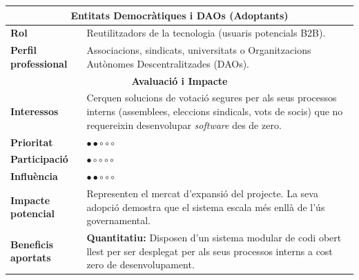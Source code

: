 \begin{table}[H]
\centering
\renewcommand{\arraystretch}{1.5}
\begin{tabularx}{\textwidth}{|l|X|}
\hline
\multicolumn{2}{|c|}{\textbf{Entitats Democràtiques i DAOs (Adoptants)}} \\ \hline
\textbf{Rol} & Reutilitzadors de la tecnologia (usuaris potencials B2B). \\ \hline
\textbf{Perfil professional} & Associacions, sindicats, universitats o Organitzacions Autònomes Descentralitzades (DAOs). \\ \hline
\multicolumn{2}{|c|}{\textbf{Avaluació i Impacte}} \\ \hline
\textbf{Interessos} & Cerquen solucions de votació segures per als seus processos interns (assemblees, eleccions sindicals, vots de socis) que no requereixin desenvolupar \textit{software} des de zero. \\ \hline
\textbf{Prioritat} & \(\bullet \bullet \circ \circ \circ\) \\ \hline
\textbf{Participació} & \(\bullet \circ \circ \circ \circ\) \\ \hline
\textbf{Influència} & \(\bullet \bullet \circ \circ \circ\) \\ \hline
\textbf{Impacte potencial} & Representen el mercat d'expansió del projecte. La seva adopció demostra que el sistema escala més enllà de l'ús governamental. \\ \hline
\textbf{Beneficis aportats} & \textbf{Quantitatiu:} Disposen d'un sistema modular de codi obert llest per ser desplegat per als seus processos interns a cost zero de desenvolupament. \\ \hline
\end{tabularx}
\end{table}

\vspace{0.5cm}

